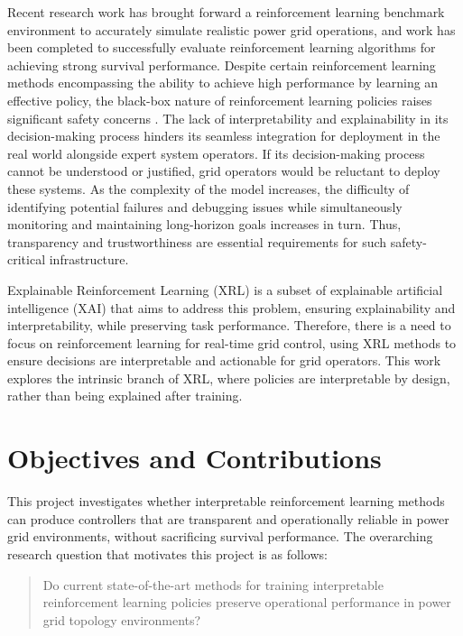 Recent research work has brought forward a reinforcement learning benchmark environment \cite{marchesini2025rl2grid} to accurately simulate realistic power grid operations, and work has been completed to successfully evaluate reinforcement learning algorithms for achieving strong survival performance. Despite certain reinforcement learning methods encompassing the ability to achieve high performance by learning an effective policy, the black-box nature of reinforcement learning policies raises significant safety concerns \cite{dulac2021challenges}. The lack of interpretability and explainability in its decision-making process hinders its seamless integration for deployment in the real world alongside expert system operators. If its decision-making process cannot be understood or justified, grid operators would be reluctant to deploy these systems. As the complexity of the model increases, the difficulty of identifying potential failures and debugging issues while simultaneously monitoring and maintaining long-horizon goals increases in turn. Thus, transparency and trustworthiness are essential requirements for such safety-critical infrastructure. 

Explainable Reinforcement Learning (XRL) \cite{milani2022survey} is a subset of explainable artificial intelligence (XAI) that aims to address this problem, ensuring explainability and interpretability, while preserving task performance. Therefore, there is a need to focus on reinforcement learning for real-time grid control, using XRL methods to ensure decisions are interpretable and actionable for grid operators. This work explores the intrinsic branch of XRL, where policies are interpretable by design, rather than being explained after training.

\section{Objectives and Contributions}

This project investigates whether interpretable reinforcement learning methods can produce controllers that are transparent and operationally reliable in power grid environments, without sacrificing survival performance. The overarching research question that motivates this project is as follows:

\begin{quote}
    Do current state-of-the-art methods for training interpretable reinforcement learning policies preserve operational performance in power grid topology environments?
\end{quote}

